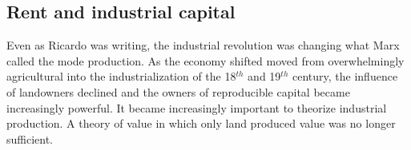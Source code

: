 \subsection{Rent and industrial capital} \label{section-rent-and-industrial-capital}

Even as Ricardo was writing, the industrial revolution was changing what Marx called the mode production.  As the economy shifted  moved from overwhelmingly agricultural into the industrialization of the 18$^{th}$  and 19$^{th}$ century, the influence of landowners declined and the owners of reproducible capital became increasingly powerful.  It became increasingly important to theorize industrial production. A theory of value in which only land produced value was no longer sufficient. 



